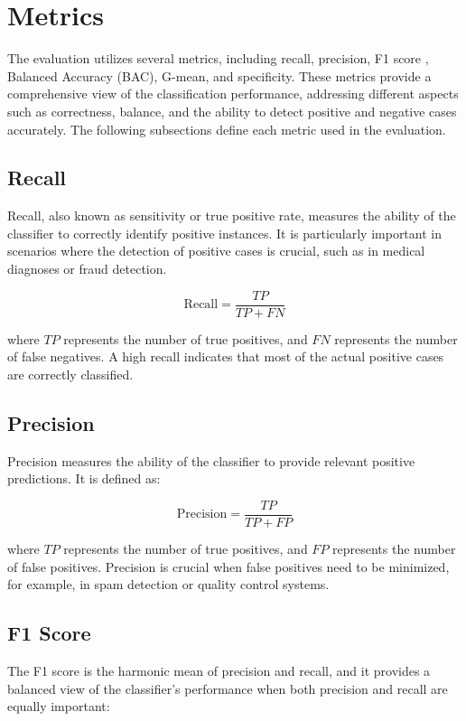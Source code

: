 \section{Metrics}
\label{sec:metrics}

The evaluation utilizes several metrics, including recall, precision, F1 score , Balanced Accuracy (BAC), G-mean, and specificity\cite{sasaki2007truth}\cite{kubat1997addressing}\cite{brodersen2010balanced}. These metrics provide a comprehensive view of the classification performance, addressing different aspects such as correctness, balance, and the ability to detect positive and negative cases accurately. The following subsections define each metric used in the evaluation.

\subsection{Recall}
Recall, also known as sensitivity or true positive rate, measures the ability of the classifier to correctly identify positive instances. It is particularly important in scenarios where the detection of positive cases is crucial, such as in medical diagnoses or fraud detection.

\begin{equation}
\text{Recall} = \frac{TP}{TP + FN}
\end{equation}

where $TP$ represents the number of true positives, and $FN$ represents the number of false negatives. A high recall indicates that most of the actual positive cases are correctly classified.

\subsection{Precision}
Precision measures the ability of the classifier to provide relevant positive predictions. It is defined as:

\begin{equation}
\text{Precision} = \frac{TP}{TP + FP}
\end{equation}

where $TP$ represents the number of true positives, and $FP$ represents the number of false positives. Precision is crucial when false positives need to be minimized, for example, in spam detection or quality control systems.

\subsection{F1 Score}
The F1 score is the harmonic mean of precision and recall, and it provides a balanced view of the classifier's performance when both precision and recall are equally important:

